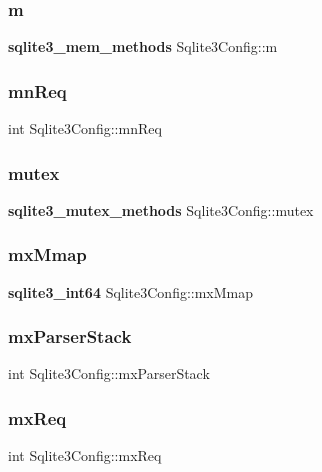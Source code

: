 \subsubsection{m}
{\footnotesize\ttfamily \textbf{ sqlite3\+\_\+mem\+\_\+methods} Sqlite3\+Config\+::m}

\mbox{\label{struct_sqlite3_config_a2abbe78d2443b7408a01f59299da1174}} 
\subsubsection{mnReq}
{\footnotesize\ttfamily int Sqlite3\+Config\+::mn\+Req}

\mbox{\label{struct_sqlite3_config_afa8189b51142fd800d1dee1987187f61}} 
\subsubsection{mutex}
{\footnotesize\ttfamily \textbf{ sqlite3\+\_\+mutex\+\_\+methods} Sqlite3\+Config\+::mutex}

\mbox{\label{struct_sqlite3_config_a1e6bd364962243bc7c5de6867e4c8af2}} 
\subsubsection{mxMmap}
{\footnotesize\ttfamily \textbf{ sqlite3\+\_\+int64} Sqlite3\+Config\+::mx\+Mmap}

\mbox{\label{struct_sqlite3_config_a5622c6caef3cd04007517a3a0c5e7ffe}} 
\subsubsection{mxParserStack}
{\footnotesize\ttfamily int Sqlite3\+Config\+::mx\+Parser\+Stack}

\mbox{\label{struct_sqlite3_config_a060f9ef5a2bda888a8253229384ab4a9}} 
\subsubsection{mxReq}
{\footnotesize\ttfamily int Sqlite3\+Config\+::mx\+Req}

